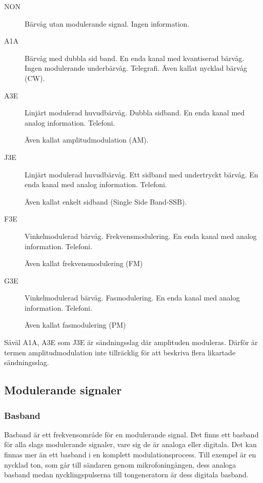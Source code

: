 \documentclass[a4paper,twoside,twocolumn,openright]{book}
\begin{document}
\begin{description}
\item[NON] Bärvåg utan modulerande signal. Ingen information.

\item[A1A] Bärvåg med dubbla sid band. En enda kanal med kvantiserad bärvåg. Ingen
modulerande underbärvåg. Telegrafi. Även kallat nycklad bärvåg (CW).

\item[A3E] Linjärt modulerad huvudbärvåg. Dubbla sidband. En enda kanal med
analog information. Telefoni.

Även kallat amplitudmodulation (AM).

\item[J3E] Linjärt modulerad huvudbärvåg. Ett sidband med undertryckt bärvåg. En
enda kanal med analog information. Telefoni.

Även kallat enkelt sidband (Single Side Band-SSB).

\item[F3E] Vinkelmodulerad bärvåg. Frekvensmodulering. En enda kanal med analog
information. Telefoni.

Även kallat frekvensmodulering (FM)

\item[G3E] Vinkelmodulerad bärvåg. Fasmodulering. En enda kanal med analog information.
Telefoni.

Även kallat fasmodulering (PM)
\end{description}

Såväl A1A, A3E som J3E är sändningsslag där amplituden moduleras. Därför är
termen amplitudmodulation inte tillräcklig för att beskriva flera likartade sändningsslag.

\subsection{Modulerande signaler}

\subsubsection{Basband}

Basband är ett frekvensområde för en modulerande signal. Det finns ett basband för
alla slags modulerande signaler, vare sig de är analoga eller digitala. Det kan finnas mer
än ett basband i en komplett modulationsprocess. Till exempel är en nycklad ton, som
går till sändaren genom mikrofoningången, dess analoga basband medan nycklingspulserna
till tongeneratorn är dess digitala basband.
\end{document}
